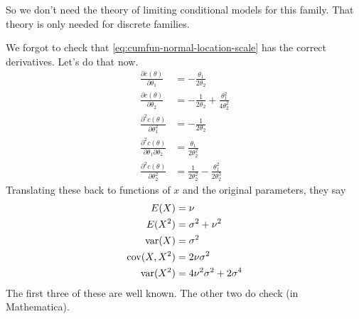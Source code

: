 So we don't need the theory of limiting conditional models for this family.
That theory is only needed for discrete families.

%
%

We forgot to check that \eqref{eq:cumfun-normal-location-scale} has
the correct derivatives.  Let's do that now.
\begin{align*}
   \frac{\partial c(\theta)}{\partial \theta_1}
   & =
   -
   \frac{\theta_1}{2 \theta_2}
   \\
   \frac{\partial c(\theta)}{\partial \theta_2}
   & =
   -
   \frac{1}{2 \theta_2}
   +
   \frac{\theta_1^2}{4 \theta_2^2}
   \\
   \frac{\partial^2 c(\theta)}{\partial \theta_1^2}
   & =
   - \frac{1}{2 \theta_2}
   \\
   \frac{\partial^2 c(\theta)}{\partial \theta_1 \partial \theta_2}
   & =
   \frac{\theta_1}{2 \theta_2^2}
   \\
   \frac{\partial^2 c(\theta)}{\partial \theta_2^2}
   & =
   \frac{1}{2 \theta_2^2}
   -
   \frac{\theta_1^2}{2 \theta_2^3}
\end{align*}
Translating these back to functions of $x$ and the original parameters,
they say
\begin{align*}
   E(X) & = \nu
   \\
   E(X^2) & = \sigma^2 + \nu^2
   \\
   \operatorname{var}(X) & = \sigma^2
   \\
   \operatorname{cov}(X, X^2) & = 2 \nu \sigma^2
   \\
   \operatorname{var}(X^2) & = 4 \nu^2 \sigma^2 + 2 \sigma^4
\end{align*}
The first three of these are well known.  The other two do check
(in Mathematica).
%

